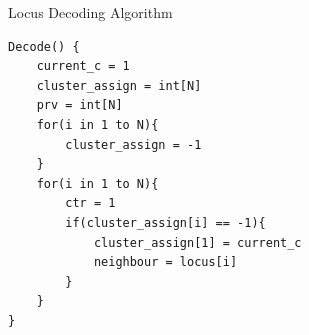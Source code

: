 \begin{table}[b]
\caption{Locus Decoding Algorithm}
\label{algorithmX}
\begin{verbatim}
Decode() {
    current_c = 1
    cluster_assign = int[N]
    prv = int[N]
    for(i in 1 to N){
        cluster_assign = -1
    }
    for(i in 1 to N){
        ctr = 1
        if(cluster_assign[i] == -1){
            cluster_assign[1] = current_c
            neighbour = locus[i]
        }
    }
}
\end{verbatim}
\end{table}


